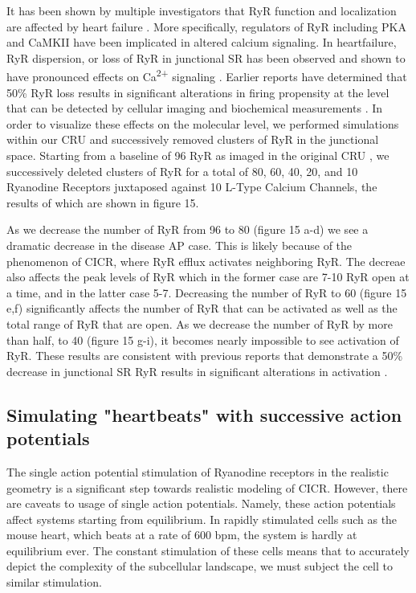 \documentclass[12pt]{ucsddissertation}
\begin{document}
It has been shown by multiple investigators that RyR function and localization are affected by heart failure \cite{Ather2013}. More specifically, regulators of RyR including PKA \cite{Vest2006} and CaMKII \cite{Hoch1999} have been implicated in altered calcium signaling. In heartfailure, RyR dispersion, or loss of RyR in junctional SR has been observed and shown to have pronounced effects on Ca\textsuperscript{2+} signaling \cite{Kolstad2018}. Earlier reports have determined that 50\% RyR loss results in significant alterations in firing propensity at the level that can be detected by cellular imaging and biochemical measurements \cite{Bround2016}. In order to visualize these effects on the molecular level, we performed simulations within our CRU  and successively removed clusters of RyR in the junctional space. Starting from a baseline of 96 RyR as imaged in the original CRU \cite{Hayashi2009}, we successively deleted clusters of RyR for a total of 80, 60, 40, 20, and 10 Ryanodine Receptors juxtaposed against 10 L-Type Calcium Channels, the results of which are shown in figure 15. 

As we decrease the number of RyR from 96 to 80 (figure 15 a-d) we see a dramatic decrease in the disease AP case. This is likely because of the phenomenon of CICR, where RyR efflux activates neighboring RyR. The decreae also affects the peak levels of RyR which in the former case are 7-10 RyR open at a time, and in the latter case 5-7. Decreasing the number of RyR to 60 (figure 15 e,f) significantly affects the number of RyR that can be activated as well as the total range of RyR that are open. As we decrease the number of RyR by more than half, to 40 (figure 15 g-i), it becomes nearly impossible to see activation of RyR. These results are consistent with previous reports that demonstrate a 50\% decrease in junctional SR RyR results in significant alterations in activation \cite{Bround2016}.


\subsection{Simulating "heartbeats" with successive action potentials}

The single action potential stimulation of Ryanodine receptors in the realistic geometry is a significant step towards realistic modeling of CICR. However, there are caveats to usage of single action potentials. Namely, these action potentials affect systems starting from equilibrium. In rapidly stimulated cells such as the mouse heart, which beats at a rate of 600 bpm, the system is hardly at equilibrium ever. The constant stimulation of these cells means that to accurately depict the complexity of the subcellular landscape, we must subject the cell to similar stimulation. 
\end{document}
